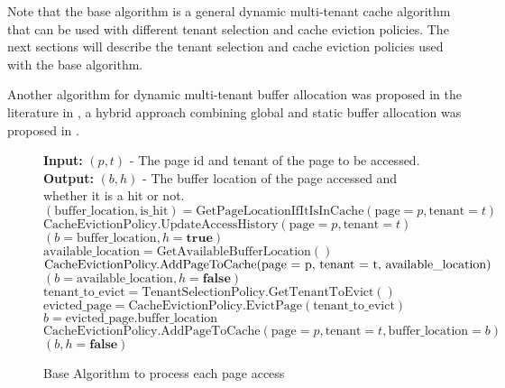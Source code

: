 Note that the base algorithm is a general dynamic multi-tenant cache algorithm that can 
be used with different tenant selection and cache eviction policies. The next sections 
will describe the tenant selection and cache eviction policies used with the base algorithm.

Another algorithm for dynamic multi-tenant buffer allocation was proposed in the 
literature in \cite{buffer-sharing-1}, a hybrid approach combining global and static 
buffer allocation was proposed in \cite{article-for-2level-forecasting}.

\begin{figure}[htbp]
    \centering
    \begin{minipage}{\linewidth}
    \begin{algorithm}[H]
        \caption{Base Algorithm to process each page access}
        \begin{algorithmic}
            \STATE \textbf{Input:} $(p, t)$ - The page id and tenant of the page to be accessed.
            \STATE \textbf{Output:} $(b, h)$ - The buffer location of the page accessed and whether it is a hit or not.
            \STATE
            \STATE $(\text{buffer\_location}, \text{is\_hit}) = \text{GetPageLocationIfItIsInCache}(\text{page} = p, \text{tenant} = t)$
                \STATE $\text{CacheEvictionPolicy.UpdateAccessHistory}(\text{page} = p, \text{tenant} = t)$
                \RETURN $(b = \text{buffer\_location}, h = \textbf{true})$
            \ELSE
                \STATE {}
                    \STATE $\text{available\_location} = \text{GetAvailableBufferLocation}()$ 
                    \STATE $\text{CacheEvictionPolicy.AddPageToCache(\text{page} = p, \text{tenant} = t, \text{available\_location})}$
                    \RETURN $(b = \text{available\_location}, h = \textbf{false})$
                \ELSE
                    \STATE {}
                    \STATE $\text{tenant\_to\_evict} = \text{TenantSelectionPolicy.GetTenantToEvict}()$
                    \STATE $\text{evicted\_page} = \text{CacheEvictionPolicy.EvictPage}(\text{tenant\_to\_evict})$
                    \STATE $b = \text{evicted\_page.buffer\_location}$
                    \STATE $\text{CacheEvictionPolicy.AddPageToCache}(\text{page} = p, \text{tenant} = t, \text{buffer\_location} = b)$
                    \RETURN $(b, h = \textbf{false})$

\end{algorithmic}
\end{algorithm}
\end{minipage}
\end{figure}
